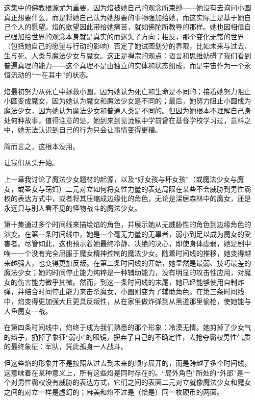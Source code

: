 这集中的佛教根源尤为重要，因为焰被她自己的观念所束缚——她没有去询问小圆真正想要什么，而是将她自己认为她想要的事物强加给她，而这实际上是基于她自己个人的愿望。焰的欲望因此带给她痛苦，就如佛陀所教导的那样\cite{ref62}。她也因相信自己强加给世界的观念本身就是真实的而迷失了方向；相反，那个变化无常的世界（包括她自己的愿望与行动的影响）否定了她试图划分的界限，比如未来与过去、生与死、人类与魔法少女与魔女。这正是禅宗的观点：语言和思维妨碍了我们看到普遍真理的能力——这个真理不是由独立的实体和状态组成，而是宇宙作为一个永恒流动的“一在其中”的状态\cite{ref63}。

焰最初努力从死亡中拯救小圆，因为她认为死亡和生命是不同的；接着她努力阻止小圆变成魔女，因为她认为魔女和魔法少女是不同的；最后，她努力阻止小圆成为魔法少女，因为她认为魔法少女和普通人类是不同的。但因为她根本不理解自己身处何种故事，值得注意的是，她到来到见泷原中学前曾在基督学校学习过，意料之中，她无法认识到自己的行为只会让事情变得更糟。

简而言之，这根本没用。

让我们从头开始。

上一章我讨论了魔法少女题材的起源，以及“好女孩与坏女孩”（或魔法少女与魔女，或圣女与荡妇）二元对立如何将女性力量的表达局限在某些不会威胁到男性霸权的表达方式中，或者将其压缩成边缘化的角色，无论是深居森林中的魔女，还是永远只与别人看不见的怪物战斗的魔法少女。

第十集通过多个时间线来描绘焰的角色，并展示她从无威胁性的角色到边缘角色的演变。在第一条时间线中，她是一个毫无力量的无辜者，弱小到足以成为魔女的受害者。尽管如此，这也预示着她最终冷静、决绝的决心，即使身体虚弱，她是剧中唯一一个没有完全屈服于魔女精神控制的魔法少女。随着时间线的推移，她变得越来越强大，也变得更加反叛。在第二条时间线的开始，她显然是最弱、技巧最差的魔法少女；她的时间停止能力纯粹是一种辅助能力，没有明显的攻击性应用，对魔女的伤害能力微乎其微。然而，到这一条时间线的末尾，她已经能够使用自制炸弹，并结合时间停止能力来击杀魔女，小圆则变为了辅助角色。在第三条时间线中，焰变得更加强大且更具反叛性，从在家里做炸弹到从黑道那里偷枪，使她能与人鱼魔女一战。

在第四条时间线中，焰终于成为我们熟悉的那个形象：冷漠无情。她剪掉了少女气的辫子，扔掉了象征“弱小”的眼镜，摒弃了自己的不确定性，去抢夺霸权男性气质的最终象征：军队，凭此孤身一人战斗。

但这些焰的形象并不是按照从过去到未来的顺序展开的，而是跨越了多个时间线，这意味着在某种意义上，所有这些焰是同时存在的。“局外角色”所处的“外部”是一个对男性霸权没有威胁的表达方式，它们之间的表面二元对立就像魔法少女和魔女之间的对立一样是虚幻的；麻美和焰不过是（恰是）同一枚硬币的两面。

